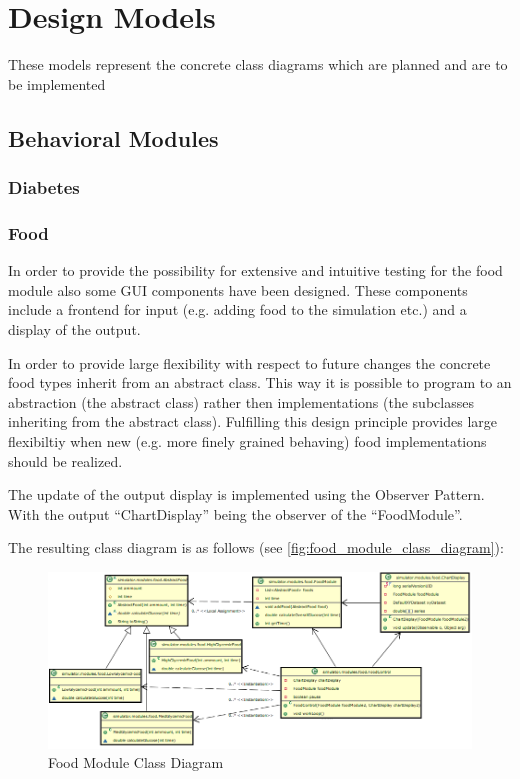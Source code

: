 \section{Design Models}
These models represent the concrete class diagrams which are planned and are to
be implemented

\subsection{Behavioral Modules}

\subsubsection{Diabetes}

\newpage
\subsubsection{Food}
In order to provide the possibility for extensive and intuitive testing for the
food module also some GUI components have been designed.
These components include a frontend for input (e.g. adding food to the
simulation etc.) and a display of the output.

In order to provide large flexibility with respect to future changes the
concrete food types inherit from an abstract class. This way it is possible to
program to an abstraction (the abstract class) rather then implementations (the
subclasses inheriting from the abstract class).
Fulfilling this design principle provides large flexibiltiy when new (e.g. more
finely grained behaving) food implementations should be realized.

The update of the output display is implemented using the Observer Pattern.
With the output ``ChartDisplay'' being the observer of the ``FoodModule''.

The resulting class diagram is as follows (see
\vref{fig:food_module_class_diagram}):

\begin{figure}[htb]
\centering
\includegraphics[width=\textwidth]{images/food_module_class_diagram2.png}
\caption{Food Module Class Diagram}
\label{fig:food_module_class_diagram}
\end{figure}

